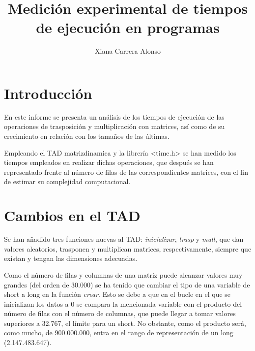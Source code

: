 \documentclass[a4paper,12pt]{article}
\title{Medición experimental de tiempos de ejecución en programas}
\author{Xiana Carrera Alonso}
\begin{document}
\maketitle
\section*{Introducción}
En este informe se presenta un análisis de los tiempos de ejecución de las operaciones de trasposición y multiplicación con matrices, así como de su crecimiento en relación con los tamaños de las últimas.\par
Empleando el TAD matrizdinamica y la librería <time.h>\: se han medido los tiempos empleados en realizar dichas operaciones, que después se han representado frente al número de filas de las correspondientes matrices, con el fin de estimar su complejidad computacional.

\section*{Cambios en el TAD}
Se han añadido tres funciones nuevas al TAD: \emph{inicializar}, \emph{trasp} y \emph{mult}, que dan valores aleatorios, trasponen y multiplican matrices, respectivamente, siempre que existan y tengan las dimensiones adecuadas.\par
Como el número de filas y columnas de una matriz puede alcanzar valores muy grandes (del orden de 30.000) se ha tenido que cambiar el tipo de una variable de short a long en la función \emph{crear}. Esto se debe a que en el bucle en el que se inicializan los datos a 0 se compara la mencionada variable con el producto del número de filas con el número de columnas, que puede llegar a tomar valores superiores a 32.767, el límite para un short. No obstante, como el producto será, como mucho, de 900.000.000, entra en el rango de representación de un long (2.147.483.647).
\end{document}
